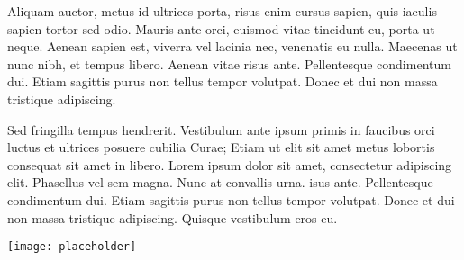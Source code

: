 \documentclass[landscape,a0paper,fontscale=0.285]{baposter} %
\begin{document}
\begin{poster}
{\begin{multicols}{2}
Aliquam auctor, metus id ultrices porta, risus enim cursus sapien, quis iaculis sapien tortor sed odio. Mauris ante orci, euismod vitae tincidunt eu, porta ut neque. Aenean sapien est, viverra vel lacinia nec, venenatis eu nulla. Maecenas ut nunc nibh, et tempus libero. Aenean vitae risus ante. Pellentesque condimentum dui. Etiam sagittis purus non tellus tempor volutpat. Donec et dui non massa tristique adipiscing.
\end{multicols}


\begin{multicols}{2}
\vspace{1em}
Sed fringilla tempus hendrerit. Vestibulum ante ipsum primis in faucibus orci luctus et ultrices posuere cubilia Curae; Etiam ut elit sit amet metus lobortis consequat sit amet in libero. Lorem ipsum dolor sit amet, consectetur adipiscing elit. Phasellus vel sem magna. Nunc at convallis urna. isus ante. Pellentesque condimentum dui. Etiam sagittis purus non tellus tempor volutpat. Donec et dui non massa tristique adipiscing. Quisque vestibulum eros eu.

\begin{center}
\texttt{[image: placeholder]}
\end{center}

\end{multicols}
}





\end{poster}
\end{document}
